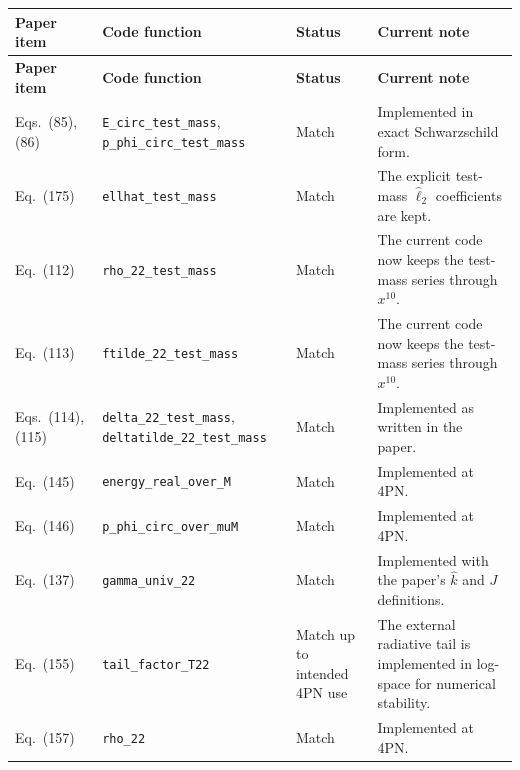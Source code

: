 \documentclass[11pt]{article}
\begin{document}
\renewcommand{\arraystretch}{1.15}
\begin{longtable}{|>{\raggedright\arraybackslash}p{}|>{\raggedright\arraybackslash}p{}|>{\raggedright\arraybackslash}p{}|>{\raggedright\arraybackslash}p{}|}
\hline
\textbf{Paper item} & \textbf{Code function} & \textbf{Status} & \textbf{Current note} \\
\hline
\endfirsthead
\hline
\textbf{Paper item} & \textbf{Code function} & \textbf{Status} & \textbf{Current note} \\
\hline
\endhead

Eqs.~(85), (86) & \texttt{E\_circ\_test\_mass}, \texttt{p\_phi\_circ\_test\_mass} & Match & Implemented in exact Schwarzschild form. \\
\hline

Eq.~(175) & \texttt{ellhat\_test\_mass} & Match & The explicit test-mass \(\hat \ell_2\) coefficients are kept. \\
\hline

Eq.~(112) & \texttt{rho\_22\_test\_mass} & Match & The current code now keeps the test-mass series through \(x^{10}\). \\
\hline

Eq.~(113) & \texttt{ftilde\_22\_test\_mass} & Match & The current code now keeps the test-mass series through \(x^{10}\). \\
\hline

Eqs.~(114), (115) & \texttt{delta\_22\_test\_mass}, \texttt{deltatilde\_22\_test\_mass} & Match & Implemented as written in the paper. \\
\hline

Eq.~(145) & \texttt{energy\_real\_over\_M} & Match & Implemented at 4PN. \\
\hline

Eq.~(146) & \texttt{p\_phi\_circ\_over\_muM} & Match & Implemented at 4PN. \\
\hline

Eq.~(137) & \texttt{gamma\_univ\_22} & Match & Implemented with the paper's \(\hat k\) and \(J\) definitions. \\
\hline

Eq.~(155) & \texttt{tail\_factor\_T22} & Match up to intended 4PN use & The external radiative tail is implemented in log-space for numerical stability. \\
\hline

Eq.~(157) & \texttt{rho\_22} & Match & Implemented at 4PN. \\
\hline


\end{longtable}
\end{document}
